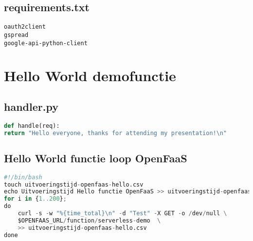 \subsection{requirements.txt}
\label{sec:requirements.txt}
\begin{lstlisting}
oauth2client
gspread
google-api-python-client
\end{lstlisting}

\section{Hello World demofunctie}
\label{sec:openfaas-hello-world-functie}
\subsection{handler.py}
\begin{lstlisting}[language=python]
def handle(req):
return "Hello everyone, thanks for attending my presentation!\n"
\end{lstlisting}

\subsection{Hello World functie loop OpenFaaS}
\begin{lstlisting}[language=python]
#!/bin/bash
touch uitvoeringstijd-openfaas-hello.csv
echo Uitvoeringstijd Hello functie OpenFaaS >> uitvoeringstijd-openfaas-hello.csv
for i in {1..200};
do
    curl -s -w "%{time_total}\n" -d "Test" -X GET -o /dev/null \
    $OPENFAAS_URL/function/serverless-demo  \
    >> uitvoeringstijd-openfaas-hello.csv
done
\end{lstlisting}